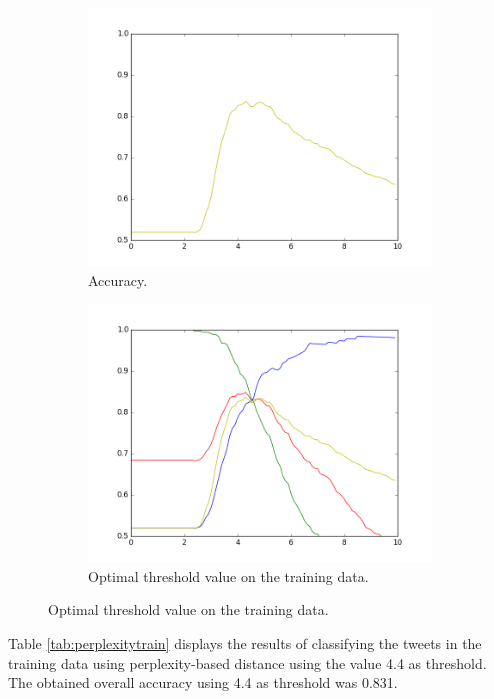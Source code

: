 \documentclass[information,article,submit,moreauthors,pdftex,10pt,a4paper]{Definitions/mdpi}
\begin{document}
\begin{figure}[H]
\begin{subfigure}[b]{0.48\linewidth}
    \includegraphics[width=\linewidth]{accuracy}
    \caption{Accuracy.}\label{fig:acc}
  \end{subfigure}
  \begin{subfigure}[b]{0.48\linewidth}
    \includegraphics[width=\linewidth]{denaperp}
    \caption{Optimal threshold value on the training data.}\label{fig:threshold}
  \end{subfigure}
\end{figure}

Table \ref{tab:perplexitytrain} displays the results of classifying the tweets in the training data using perplexity-based distance using the value 4.4 as threshold. The obtained overall accuracy using 4.4 as threshold was 0.831.
\end{document}
